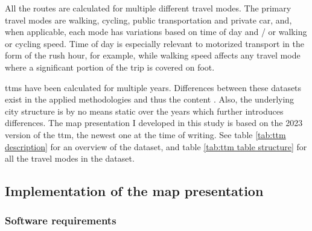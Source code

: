 All the routes are calculated for multiple different travel modes.
The primary travel modes are walking, cycling, public transportation and private car,
and, when applicable, each mode has variations based on
time of day and / or walking or cycling speed.
Time of day is especially relevant to motorized transport
in the form of the rush hour, for example,
while walking speed affects any travel mode
where a significant portion of the trip is covered on foot.


\acrshort{ttm}s have been calculated for multiple years.
Differences between these datasets exist in the applied methodologies and thus the content
\parencite{ten2020}.
Also, the underlying city structure is by no means static over the years
which further introduces differences.
The map presentation I developed in this study
is based on the 2023 version of the \acrshort{ttm},
the newest one at the time of writing.
See table \ref{tab:ttm description} for an overview of the dataset,
and table \ref{tab:ttm table structure} for all the travel modes in the dataset.







\subsection{Implementation of the map presentation}

\subsubsection{Software requirements}


